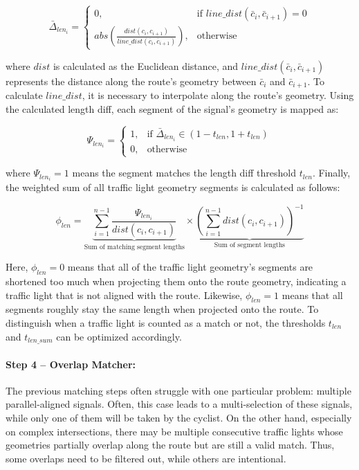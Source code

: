\begin{equation}
    \bar{\Delta}_{len_i} = 
        \begin{cases}
            0,& \text{if } line\_dist(\bar{c}_i, \bar{c}_{i+1}) = 0 \\
            abs(\frac{dist(c_{i}, c_{i+1})}{line\_dist(\bar{c}_{i}, \bar{c}_{i+1})}),              & \text{otherwise}
        \end{cases}
\end{equation}

where $dist$ is calculated as the Euclidean distance, and $line\_dist(\bar{c}_i, \bar{c}_{i+1})$ represents the distance along the route's geometry between $\bar{c}_i$ and $\bar{c}_{i+1}$. To calculate $line\_dist$, it is necessary to interpolate along the route's geometry. Using the calculated length diff, each segment of the signal's geometry is mapped as:

\begin{equation}
\Psi_{len_i} = 
    \begin{cases}
            1,& \text{if } \bar{\Delta}_{len_{i}} \in \left(1 - t_{len}, 1 + t_{len}\right)\\
            0,              & \text{otherwise}
        \end{cases}
\end{equation}

where $\Psi_{len_i} = 1$ means the segment matches the length diff threshold $t_{len}$. Finally, the weighted sum of all traffic light geometry segments is calculated as follows:

\begin{equation} 
\phi_{len} = 
    \underbrace{\sum_{i=1}^{n-1} 
    \frac{\Psi_{len_i}}{dist(c_i, c_{i+1})}}_{\text{Sum of matching segment lengths}}
    \times
    \underbrace{(\sum_{i=1}^{n-1} dist(c_i, c_{i+1}))^{-1}}_{\text{Sum of segment lengths}}
\end{equation}

Here, $\phi_{len} = 0$ means that all of the traffic light geometry's segments are shortened too much when projecting them onto the route geometry, indicating a traffic light that is not aligned with the route. Likewise, $\phi_{len} = 1$ means that all segments roughly stay the same length when projected onto the route. To distinguish when a traffic light is counted as a match or not, the thresholds $t_{len}$ and $t_{len\_sum}$ can be optimized accordingly.

\paragraph{Step 4 -- Overlap Matcher:} The previous matching steps often struggle with one particular problem: multiple parallel-aligned signals. Often, this case leads to a multi-selection of these signals, while only one of them will be taken by the cyclist. On the other hand, especially on complex intersections, there may be multiple consecutive traffic lights whose geometries partially overlap along the route but are still a valid match. Thus, some overlaps need to be filtered out, while others are intentional.

